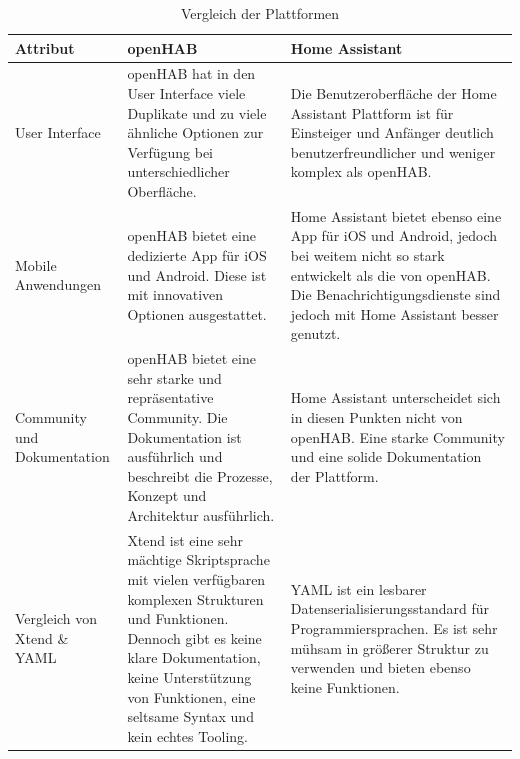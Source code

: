 \documentclass[
  ngerman           %
  ,twoside          %
  ,11pt
  ,pdftex
]{report}
\begin{document}
\begin{table}[hbt!]
  \begin{center}
      \begin{tabular}{| p{3.0cm} | p{6.2cm} | p{6.2cm} | }
          \hline
            \textbf{Attribut} & \textbf{openHAB} & \textbf{Home Assistant} \\
          \hline
            User Interface & openHAB hat in den User Interface viele Duplikate und zu viele ähnliche Optionen zur Verfügung bei unterschiedlicher Oberfläche. & Die Benutzeroberfläche der Home Assistant Plattform ist für Einsteiger und Anfänger deutlich benutzerfreundlicher und weniger komplex als openHAB. \\
          \hline
            Mobile Anwendungen & openHAB bietet eine dedizierte App für iOS und Android. Diese ist mit innovativen Optionen ausgestattet.  & Home Assistant bietet ebenso eine App für iOS und Android, jedoch bei weitem nicht so stark entwickelt als die von openHAB. Die Benachrichtigungsdienste sind jedoch mit Home Assistant besser genutzt. \\ 
          \hline
            Community und Dokumentation & openHAB bietet eine sehr starke und repräsentative Community. Die Dokumentation ist ausführlich und beschreibt die Prozesse, Konzept und Architektur ausführlich. & Home Assistant unterscheidet sich in diesen Punkten nicht von openHAB. Eine starke Community und eine solide Dokumentation der Plattform.  \\
          \hline
            Vergleich von Xtend \& YAML & Xtend ist eine sehr mächtige Skriptsprache mit vielen verfügbaren komplexen Strukturen und Funktionen. Dennoch gibt es keine klare Dokumentation, keine Unterstützung von Funktionen, eine seltsame Syntax und kein echtes Tooling. & YAML ist ein lesbarer Datenserialisierungsstandard für Programmiersprachen. Es ist sehr mühsam in größerer Struktur zu verwenden und bieten ebenso keine Funktionen.  \\ 
          \hline 
      \end{tabular}
  \end{center}
  \caption{Vergleich der Plattformen \cite{sh-uni-comparison} \cite{msuttner-comparison} \cite{barclay-comparison}}
  \label{tab:comparisonTableHAOS-openHAB-part2}
\end{table}
\end{document}
